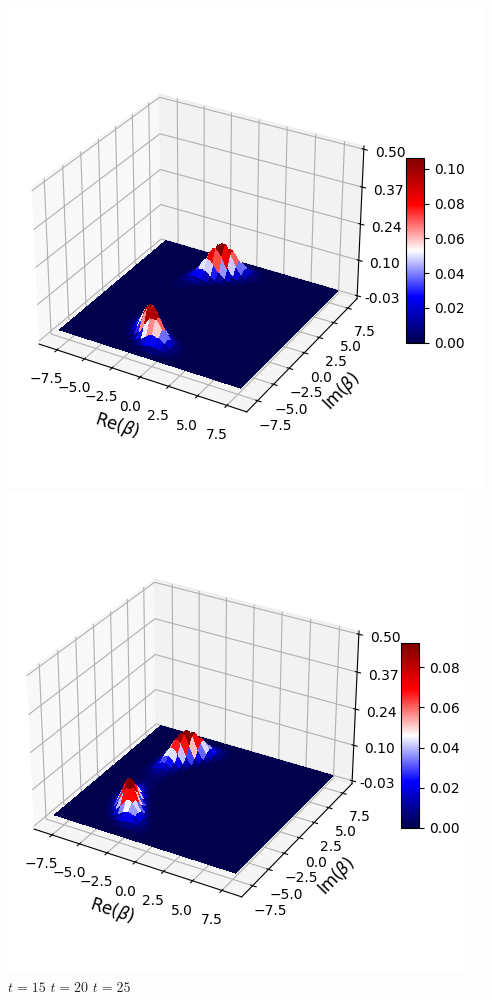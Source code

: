 \documentclass[11pt, oneside]{book}
\theoremstyle{break}
\theoremstyle{break}
\begin{document}
\begin{center}
\includegraphics[scale=0.4]{542HW6/Q(20)}
\includegraphics[scale=0.4]{542HW6/Q(25)}\\
$t=15$ \qquad\qquad\qquad\qquad\qquad $t=20$ \qquad\qquad\qquad\qquad\qquad $t=25$\\

\end{center}
\end{document}
